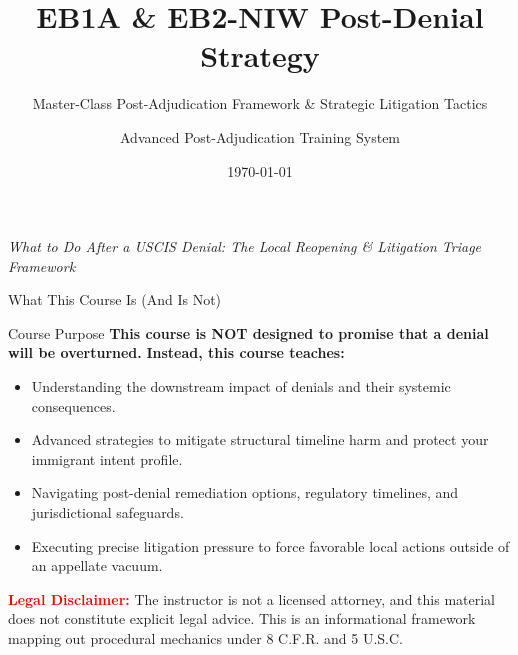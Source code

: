 \documentclass[11pt]{beamer}
\title{EB1A \& EB2-NIW Post-Denial Strategy}
\subtitle{Master-Class Post-Adjudication Framework \& Strategic Litigation Tactics}
\author{Advanced Post-Adjudication Training System}
\date{\today}
\begin{document}
	
	\begin{frame}
		\titlepage
		\centering
		\scriptsize \textit{What to Do After a USCIS Denial: The Local Reopening \& Litigation Triage Framework}
	\end{frame}
	
	\begin{frame}{What This Course Is (And Is Not)}
		\scriptsize
		\begin{block}{Course Purpose}
			\textbf{This course is NOT designed to promise that a denial will be overturned.}
			\vspace{0.1cm}
			\textbf{Instead, this course teaches:}
			\begin{itemize}
				\item Understanding the downstream impact of denials and their systemic consequences.
				\item Advanced strategies to mitigate structural timeline harm and protect your immigrant intent profile.
				\item Navigating post-denial remediation options, regulatory timelines, and jurisdictional safeguards.
				\item Executing precise litigation pressure to force favorable local actions outside of an appellate vacuum.
			\end{itemize}
			\textcolor{red}{\textbf{Legal Disclaimer:}} The instructor is not a licensed attorney, and this material does not constitute explicit legal advice. This is an informational framework mapping out procedural mechanics under 8 C.F.R. and 5 U.S.C.
		\end{block}
	\end{frame}
	
	
\end{document}
